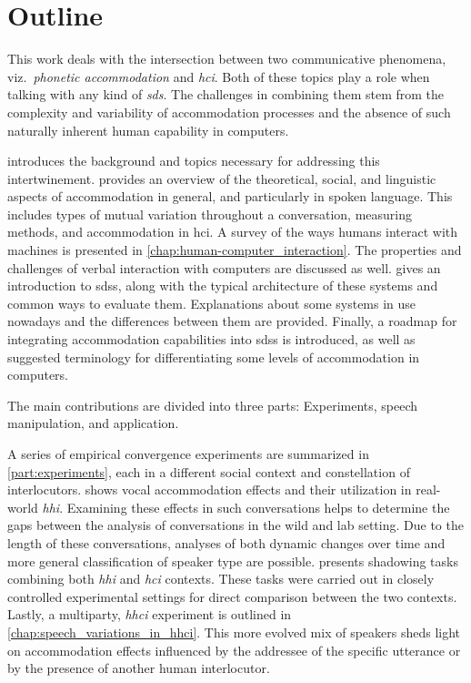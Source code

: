 \newpage
\section*{Outline}
%
This work deals with the intersection between two communicative phenomena, viz.\ \emph{phonetic accommodation} and \emph{\acl{hci}}.
Both of these topics play a role when talking with any kind of \emph{\acl{sds}}.
The challenges in combining them stem from the complexity and variability of accommodation processes and the absence of such naturally inherent human capability in computers.

 introduces the background and topics necessary for addressing this intertwinement.
 provides an overview of the theoretical, social, and linguistic aspects of accommodation in general, and particularly in spoken language.
This includes types of mutual variation throughout a conversation, measuring methods, and accommodation in \acl{hci}.
A survey of the ways humans interact with machines is presented in \cref{chap:human-computer_interaction}.
The properties and challenges of verbal interaction with computers are discussed as well.
 gives an introduction to \aclp{sds}, along with the typical architecture of these systems and common ways to evaluate them.
Explanations about some systems in use nowadays and the differences between them are provided.
Finally, a roadmap for integrating accommodation capabilities into \aclp{sds} is introduced, as well as suggested terminology for differentiating some levels of accommodation in computers.

The main contributions are divided into three parts: Experiments, speech manipulation, and application.

A series of empirical convergence experiments are summarized in \cref{part:experiments}, each in a different social context and constellation of interlocutors.
 shows vocal accommodation effects and their utilization in real-world \emph{\acl{hhi}}.
Examining these effects in such conversations helps to determine the gaps between the analysis of conversations in the wild and lab setting.
Due to the length of these conversations, analyses of both dynamic changes over time and more general classification of speaker type are possible.
 presents shadowing tasks combining both \emph{\acl{hhi}} and \emph{\acl{hci}} contexts.
These tasks were carried out in closely controlled experimental settings for direct comparison between the two contexts.
Lastly, a multiparty, \emph{\acl{hhci}} experiment is outlined in \cref{chap:speech_variations_in_hhci}.
This more evolved mix of speakers sheds light on accommodation effects influenced by the addressee of the specific utterance or by the presence of another human interlocutor.

